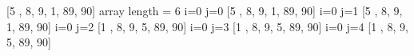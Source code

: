 [5 , 8, 9, 1, 89, 90] array  length = 6
i=0 j=0 [5 , 8, 9, 1, 89, 90]
i=0 j=1 [5 , 8, 9, 1, 89, 90]
i=0 j=2 [1 , 8, 9, 5, 89, 90]
i=0 j=3 [1 , 8, 9, 5, 89, 90]
i=0 j=4 [1 , 8, 9, 5, 89, 90]

